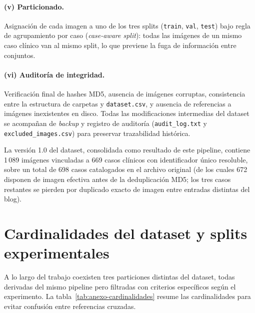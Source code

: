 \paragraph{(v) Particionado.} Asignación de cada imagen a uno de los
tres splits (\texttt{train}, \texttt{val}, \texttt{test}) bajo regla
de agrupamiento por caso (\emph{case-aware split}): todas las
imágenes de un mismo caso clínico van al mismo split, lo que previene
la fuga de información entre conjuntos.

\paragraph{(vi) Auditoría de integridad.} Verificación final de
hashes MD5, ausencia de imágenes corruptas, consistencia entre la
estructura de carpetas y \texttt{dataset.csv}, y ausencia de
referencias a imágenes inexistentes en disco. Todas las
modificaciones intermedias del dataset se acompañan de \emph{backup} y
registro de auditoría (\texttt{audit\_log.txt} y
\texttt{excluded\_images.csv}) para preservar trazabilidad histórica.

La versión 1.0 del dataset, consolidada como resultado de este
pipeline, contiene 1\,089 imágenes vinculadas a 669 casos
clínicos con identificador único resoluble, sobre un total de
698 casos catalogados en el archivo original (de los cuales 672
disponen de imagen efectiva antes de la deduplicación MD5; los
tres casos restantes se pierden por duplicado exacto de imagen
entre entradas distintas del blog).

\section{Cardinalidades del dataset y splits experimentales}
\label{sec:anexo-cardinalidades}

A lo largo del trabajo coexisten tres particiones distintas del
dataset, todas derivadas del mismo pipeline pero filtradas con
criterios específicos según el experimento. La
tabla~\ref{tab:anexo-cardinalidades} resume las cardinalidades para
evitar confusión entre referencias cruzadas.


